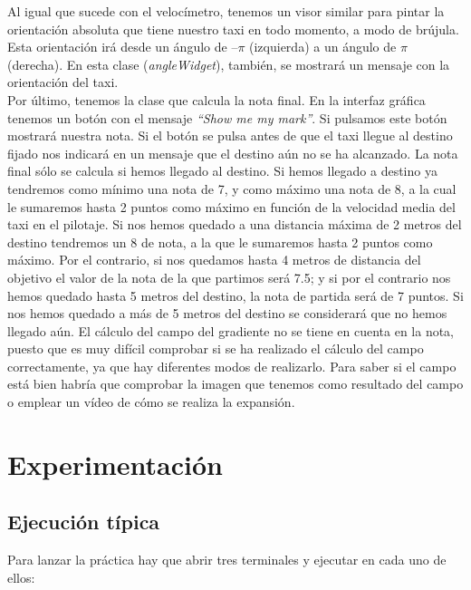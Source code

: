 Al igual que sucede con el velocímetro, tenemos un visor similar para pintar la orientación absoluta que tiene nuestro taxi en todo momento, a modo de brújula. Esta orientación irá desde un ángulo de –\(\pi\) (izquierda) a un ángulo de \(\pi\) (derecha). En esta clase (\textit{angleWidget}), también, se mostrará un mensaje con la orientación del taxi.\\

Por último, tenemos la clase que calcula la nota final. En la interfaz gráfica tenemos un botón con el mensaje \textit{``Show me my mark''}. Si pulsamos este botón mostrará nuestra nota. Si el botón se pulsa antes de que el taxi llegue al destino fijado nos indicará en un mensaje que el destino aún no se ha alcanzado. La nota final sólo se calcula si hemos llegado al destino. Si hemos llegado a destino ya tendremos como mínimo una nota de 7, y como máximo una nota de 8, a la cual le sumaremos hasta 2 puntos como máximo en función de la velocidad media del taxi en el pilotaje. Si nos hemos quedado a una distancia máxima de 2 metros del destino tendremos un 8 de nota, a la que le sumaremos hasta 2 puntos como máximo. Por el contrario, si nos quedamos hasta 4 metros de distancia del objetivo el valor de la nota de la que partimos será 7.5; y si por el contrario nos hemos quedado hasta 5 metros del destino, la nota de partida será de 7 puntos. Si nos hemos quedado a más de 5 metros del destino se considerará que no hemos llegado aún. El cálculo del campo del gradiente no se tiene en cuenta en la nota, puesto que es muy difícil comprobar si se ha realizado el cálculo del campo correctamente, ya que hay diferentes modos de realizarlo. Para saber si el campo está bien habría que comprobar la imagen que tenemos como resultado del campo o emplear un vídeo de cómo se realiza la expansión.


\section{Experimentación}

\subsection{Ejecución típica}
Para lanzar la práctica hay que abrir tres terminales y ejecutar en cada uno de ellos:

